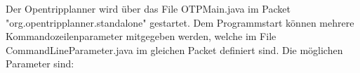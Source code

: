 Der Opentripplanner wird über das File OTPMain.java im Packet "org.opentripplanner.standalone" gestartet. Dem Programmstart können mehrere Kommandozeilenparameter mitgegeben werden, welche im File CommandLineParameter.java im gleichen Packet definiert sind. Die möglichen Parameter sind:
